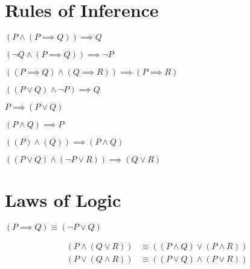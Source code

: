 \section*{Rules of Inference} \label{rulesofinference}

\begin{axiom_appendix}
$(P \wedge (P \implies Q)) \implies Q $
\end{axiom_appendix}

\begin{axiom_appendix}
$(\neg Q \wedge (P \implies Q)) \implies \neg P $
\end{axiom_appendix}

\begin{axiom_appendix}
\hfill

$((P \implies Q) \wedge (Q \implies R)) \implies (P \implies R) $
\end{axiom_appendix}

\begin{axiom_appendix}
$((P \vee Q) \wedge \neg P) \implies Q$
\end{axiom_appendix}

\begin{axiom_appendix}[Addition]
$P \implies (P \vee Q)$
\end{axiom_appendix}

\begin{axiom_appendix}[Simplification]
$(P \wedge Q) \implies P$
\end{axiom_appendix}

\begin{axiom_appendix}[Conjunction]
$((P) \wedge (Q)) \implies (P \wedge Q)$
\end{axiom_appendix}

\begin{axiom_appendix}[Resolution]
$((P \vee Q) \wedge (\neg P \vee R)) \implies (Q \vee R)$
\end{axiom_appendix}

\section*{Laws of Logic}

\begin{axiom_appendix}
$(P \implies Q) \equiv (\neg P \vee Q)$
\end{axiom_appendix}

\begin{axiom_appendix}
\begin{align*}
    (P \wedge (Q \vee R)) &\equiv ((P \wedge Q) \vee (P \wedge R)) \\
    (P \vee (Q \wedge R)) &\equiv ((P \vee Q) \wedge (P \vee R))
\end{align*}
\end{axiom_appendix}

